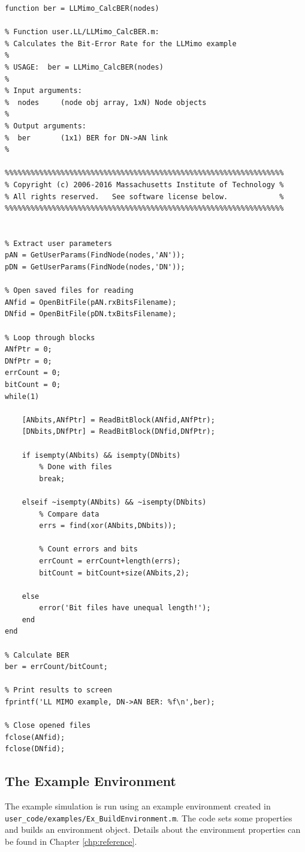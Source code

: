 \begin{lstlisting}[name=llmimoCalcBER]
function ber = LLMimo_CalcBER(nodes)

% Function user.LL/LLMimo_CalcBER.m:
% Calculates the Bit-Error Rate for the LLMimo example
%
% USAGE:  ber = LLMimo_CalcBER(nodes)
%
% Input arguments:
%  nodes     (node obj array, 1xN) Node objects
%
% Output arguments:
%  ber       (1x1) BER for DN->AN link
%

%%%%%%%%%%%%%%%%%%%%%%%%%%%%%%%%%%%%%%%%%%%%%%%%%%%%%%%%%%%%%%%%%
% Copyright (c) 2006-2016 Massachusetts Institute of Technology %
% All rights reserved.   See software license below.            %
%%%%%%%%%%%%%%%%%%%%%%%%%%%%%%%%%%%%%%%%%%%%%%%%%%%%%%%%%%%%%%%%%


% Extract user parameters
pAN = GetUserParams(FindNode(nodes,'AN'));
pDN = GetUserParams(FindNode(nodes,'DN'));

% Open saved files for reading
ANfid = OpenBitFile(pAN.rxBitsFilename);
DNfid = OpenBitFile(pDN.txBitsFilename);

% Loop through blocks
ANfPtr = 0;
DNfPtr = 0;
errCount = 0;
bitCount = 0;
while(1)

    [ANbits,ANfPtr] = ReadBitBlock(ANfid,ANfPtr);
    [DNbits,DNfPtr] = ReadBitBlock(DNfid,DNfPtr);

    if isempty(ANbits) && isempty(DNbits)
        % Done with files
        break;

    elseif ~isempty(ANbits) && ~isempty(DNbits)
        % Compare data
        errs = find(xor(ANbits,DNbits));

        % Count errors and bits
        errCount = errCount+length(errs);
        bitCount = bitCount+size(ANbits,2);

    else
        error('Bit files have unequal length!');
    end
end

% Calculate BER
ber = errCount/bitCount;

% Print results to screen
fprintf('LL MIMO example, DN->AN BER: %f\n',ber);

% Close opened files
fclose(ANfid);
fclose(DNfid);
\end{lstlisting}


\subsection{The Example Environment} \label{sec:exampleEnv}

The example simulation is run using an example environment created
in \verb+user_code/examples/Ex_BuildEnvironment.m+.  The code sets some
properties and builds an environment object.  Details about the environment
properties can be found in Chapter \ref{chp:reference}.

